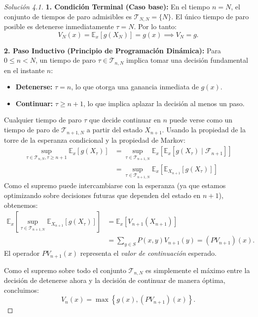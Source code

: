 \documentclass[10pt,a4paper]{article}
\begin{document}
\begin{proof}[Solución 4.1]
    \textbf{1. Condición Terminal (Caso base):}
    En el tiempo $n = N$, el conjunto de tiempos de paro admisibles es $\mathcal{T}_{N,N} = \{N\}$. El único tiempo de paro posible es detenerse inmediatamente $\tau = N$.
    Por lo tanto:
    \[ V_N(x) = \mathbb{E}_x[g(X_N)] = g(x) \implies V_N = g. \]

    \textbf{2. Paso Inductivo (Principio de Programación Dinámica):}
    Para $0 \le n < N$, un tiempo de paro $\tau \in \mathcal{T}_{n,N}$ implica tomar una decisión fundamental en el instante $n$: 
    \begin{itemize}
        \item \textbf{Detenerse:} $\tau = n$, lo que otorga una ganancia inmediata de $g(x)$.
        \item \textbf{Continuar:} $\tau \ge n+1$, lo que implica aplazar la decisión al menos un paso.
    \end{itemize}
    Cualquier tiempo de paro $\tau$ que decide continuar en $n$ puede verse como un tiempo de paro de $\mathcal{T}_{n+1, N}$ a partir del estado $X_{n+1}$.
    Usando la propiedad de la torre de la esperanza condicional y la propiedad de Markov:
    \begin{align*}
        \sup_{\tau \in \mathcal{T}_{n,N}, \tau \ge n+1} \mathbb{E}_x[g(X_\tau)] &= \sup_{\tau \in \mathcal{T}_{n+1,N}} \mathbb{E}_x \left[ \mathbb{E}_x[g(X_\tau) \mid \mathcal{F}_{n+1}] \right] \\
        &= \sup_{\tau \in \mathcal{T}_{n+1,N}} \mathbb{E}_x \left[ \mathbb{E}_{X_{n+1}}[g(X_\tau)] \right]
    \end{align*}
    Como el supremo puede intercambiarse con la esperanza (ya que estamos optimizando sobre decisiones futuras que dependen del estado en $n+1$), obtenemos:
    \begin{align*}
        \mathbb{E}_x \left[ \sup_{\tau \in \mathcal{T}_{n+1,N}} \mathbb{E}_{X_{n+1}}[g(X_\tau)] \right] &= \mathbb{E}_x [V_{n+1}(X_{n+1})] \\
        &= \sum_{y \in S} P(x, y) V_{n+1}(y) = (P V_{n+1})(x).
    \end{align*}
    El operador $P V_{n+1}(x)$ representa el \textit{valor de continuación} esperado.
    
    Como el supremo sobre todo el conjunto $\mathcal{T}_{n,N}$ es simplemente el máximo entre la decisión de detenerse ahora y la decisión de continuar de manera óptima, concluimos:
    \[ V_n(x) = \max \left\{ g(x), (P V_{n+1})(x) \right\}. \]
\end{proof}
\end{document}
